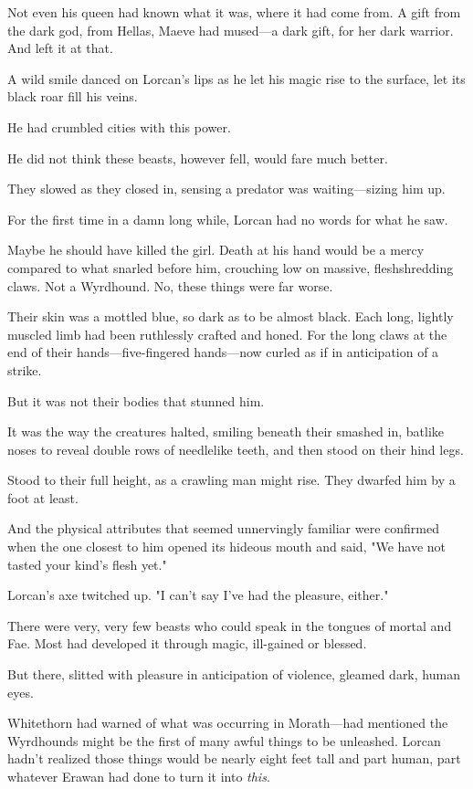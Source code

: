 Not even his queen had known what it was, where it had come from.
A gift from the dark god, from Hellas, Maeve had mused---a dark gift, for her dark warrior.
And left it at that.

A wild smile danced on Lorcan's lips as he let his magic rise to the surface, let its black roar fill his veins.

He had crumbled cities with this power.

He did not think these beasts, however fell, would fare much better.

They slowed as they closed in, sensing a predator was waiting---sizing him up.

For the first time in a damn long while, Lorcan had no words for what he saw.

Maybe he should have killed the girl.
Death at his hand would be a mercy compared to what snarled before him, crouching low on massive, fleshshredding claws.
Not a Wyrdhound.
No, these things were far worse.

Their skin was a mottled blue, so dark as to be almost black.
Each long, lightly muscled limb had been ruthlessly crafted and honed.
For the long claws at the end of their hands---five-fingered hands---now curled as if in anticipation of a strike.

But it was not their bodies that stunned him.

It was the way the creatures halted, smiling beneath their smashed in, batlike noses to reveal double rows of needlelike teeth, and then stood on their hind legs.

Stood to their full height, as a crawling man might rise.
They dwarfed him by a foot at least.

And the physical attributes that seemed unnervingly familiar were confirmed when the one closest to him opened its hideous mouth and said, "We have not tasted your kind's flesh yet."

Lorcan's axe twitched up.
"I can't say I've had the pleasure, either."

There were very, very few beasts who could speak in the tongues of mortal and Fae.
Most had developed it through magic, ill-gained or blessed.

But there, slitted with pleasure in anticipation of violence, gleamed dark, human eyes.

Whitethorn had warned of what was occurring in Morath---had mentioned the Wyrdhounds might be the first of many awful things to be unleashed.
Lorcan hadn't realized those things would be nearly eight feet tall and part human, part whatever Erawan had done to turn it into \emph{this}.

